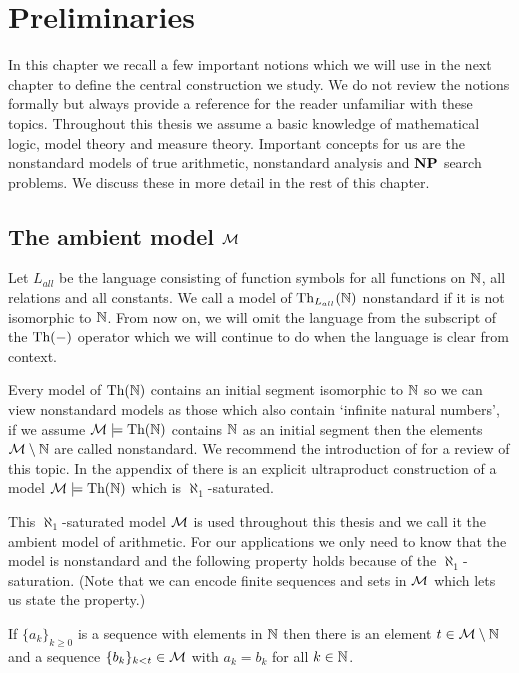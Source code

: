 \chapter*{Preliminaries}

In this chapter we recall a few important notions which we will use in the next chapter to define the central construction we study. We do not review the notions formally but always provide a reference for the reader unfamiliar with these topics. Throughout this thesis we assume a basic knowledge of mathematical logic, model theory and measure theory. Important concepts for us are the nonstandard models of true arithmetic, nonstandard analysis and $\textbf{NP}$ search problems. We discuss these in more detail in the rest of this chapter.

\section*{The ambient model \texorpdfstring{$\mathcal{M}$}{M}}

Let $L_{all}$ be the language consisting of function symbols for all functions on $\mathbb{N}$, all relations and all constants. We call a model of $\text{Th}_{L_{all}}(\mathbb{N})$ nonstandard if it is not isomorphic to $\mathbb{N}$. From now on, we will omit the language from the subscript of the $\text{Th}(-)$ operator which we will continue to do when the language is clear from context. 

Every model of $\text{Th}(\mathbb{N})$ contains an initial segment isomorphic to $\mathbb{N}$ so we can view nonstandard models as those which also contain `infinite natural numbers', if we assume $\mathcal{M}\models \text{Th}(\mathbb{N})$ contains $\mathbb{N}$ as an initial segment then the elements $\mathcal{M}\setminus \mathbb{N}$ are called nonstandard. We recommend the introduction of \cite{kaye1991pa} for a review of this topic. In the appendix of \cite{krajicek2010forcing} there is an explicit ultraproduct construction of a model $\mathcal{M}\models \text{Th}(\mathbb{N})$ which is $\aleph_1$-saturated.

This $\aleph_1$-saturated model $\mathcal{M}$ is used throughout this thesis and we call it the ambient model of arithmetic. For our applications we only need to know that the model is nonstandard and the following property holds because of the $\aleph_1$-saturation. (Note that we can encode finite sequences and sets in $\mathcal{M}$ which lets us state the property.)

\begin{prope}
If $\{a_k\}_{k\geq 0}$ is a sequence with elements in $\mathbb{N}$ then there is an element $t\in \mathcal{M} \setminus \mathbb{N}$ and a sequence $\{b_k\}_{k<t}\in \mathcal{M}$ with $a_k=b_k$ for all $k\in \mathbb{N}$.
\end{prope}

